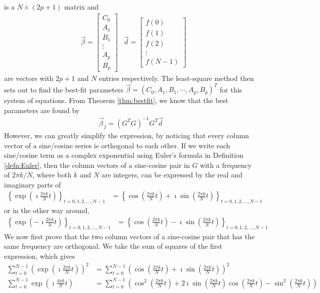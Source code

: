 is a $N \times (2p+1)$ matrix and
\begin{align*}
&\vec{\beta} = 
\begin{bmatrix}
C_0 \\
A_1 \\
B_1 \\
\vdots \\
A_p \\
B_p
\end{bmatrix}
&\vec{d} = 
\begin{bmatrix}
f(0) \\
f(1) \\
f(2) \\
\vdots \\
f(N-1)
\end{bmatrix}
\end{align*}
are vectors with $2p+1$ and $N$ entries respectively. The least-square method then sets out to find the best-fit parameters $\vec{\beta} = (C_0, A_1, B_1, \cdots, A_p, B_p)^T$ for this system of equations. From Theorem \ref{thm:bestfit}, we know that the best parameters are found by
\begin{align*}
\vec{\beta}_f = (G^TG)^{-1}G^T\vec{d}
\end{align*}
However, we can greatly simplify the expression, by noticing that every column vector of a sine/cosine series is orthogonal to each other. If we write each sine/cosine term as a complex exponential using Euler's formula in Definition \ref{defn:Euler}, then the column vectors of a sine-cosine pair in $G$ with a frequency of $2\pi k/N$, where both $k$ and $N$ are integers, can be expressed by the real and imaginary parts of
\begin{align*}
\left\{\exp(\imath \frac{2\pi k}{N} t)\right\}_{t = 0,1,2,\ldots,N-1}
&= \left\{\cos(\frac{2\pi k}{N} t) + \imath\sin(\frac{2\pi k}{N} t) \right\}_{t = 0,1,2,\ldots,N-1}
\end{align*}
or in the other way around,
\begin{align*}
\left\{\exp(-\imath \frac{2\pi k}{N} t)\right\}_{t = 0,1,2,\ldots,N-1}
&= \left\{\cos(\frac{2\pi k}{N} t) - \imath\sin(\frac{2\pi k}{N} t) \right\}_{t = 0,1,2,\ldots,N-1}
\end{align*}
We now first prove that the two column vectors of a sine-cosine pair that has the same frequency are orthogonal. We take the sum of squares of the first expression, which gives
\begin{align*}
\sum_{t=0}^{N-1} (\exp(\imath \frac{2\pi k}{N} t))^2 &= \sum_{t=0}^{N-1} (\cos(\frac{2\pi k}{N} t) + \imath\sin(\frac{2\pi k}{N} t))^2 \\
\sum_{t=0}^{N-1} \exp(\imath \frac{4\pi k}{N} t) &= \sum_{t=0}^{N-1} (\cos^2(\frac{2\pi k}{N} t) + 2\imath\sin(\frac{2\pi k}{N} t)\cos(\frac{2\pi k}{N} t) - \sin^2(\frac{2\pi k}{N} t))
\end{align*}
